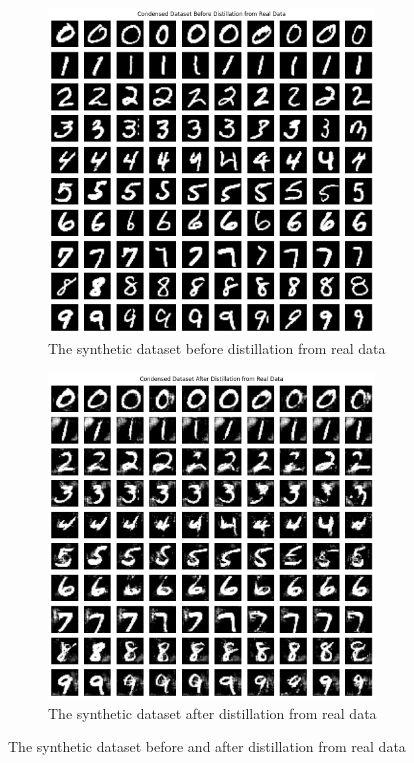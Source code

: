 \documentclass[onecolumn]{IEEEtran}
\begin{document}
\begin{figure}[H]
    \centering
    \begin{subfigure}{.5\textwidth}
        \centering
        \includegraphics[width=0.95\textwidth]{images/MNIST_pad_before_distil_real.png}
        \caption{The synthetic dataset before distillation from real data}
        \label{fig:MNIST_pad_before_distil_real}
    \end{subfigure}%
    \begin{subfigure}{.5\textwidth}
        \centering
        \includegraphics[width=0.95\textwidth]{images/MNIST_pad_after_distil_real.png}
        \caption{The synthetic dataset after distillation from real data}
        \label{fig:MNIST_pad_after_distil_real}
    \end{subfigure}
    \caption{The synthetic dataset before and after distillation from real data}
\end{figure}
\end{document}
